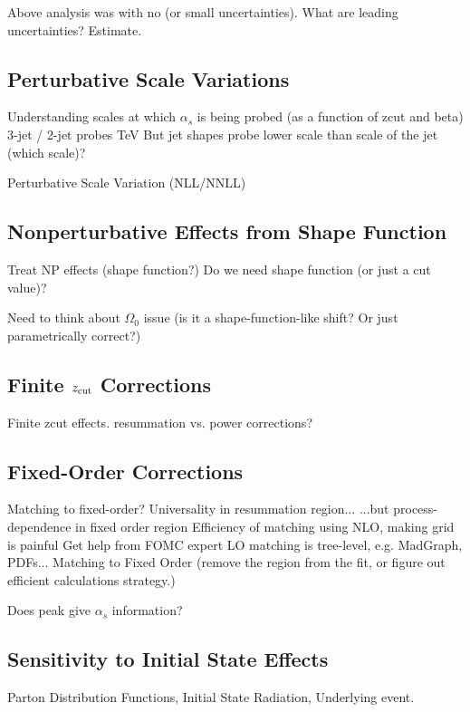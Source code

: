 
Above analysis was with no (or small uncertainties).  What are leading uncertainties?  Estimate.

\subsection{Perturbative Scale Variations}

	Understanding scales at which $\alpha_s$ is being probed (as a function of zcut and beta)
		3-jet / 2-jet probes TeV
		But jet shapes probe lower scale than scale of the jet (which scale)?

	Perturbative Scale Variation (NLL/NNLL)


\subsection{Nonperturbative Effects from Shape Function}

	Treat NP effects (shape function?)  	Do we need shape function (or just a cut value)?

	Need to think about $\Omega_0$ issue (is it a shape-function-like shift?  Or just parametrically correct?)


\subsection{Finite $z_{\rm cut}$ Corrections}

	Finite zcut effects.  resummation vs.  power corrections?

\subsection{Fixed-Order Corrections}

	Matching to fixed-order?
		Universality in resummation region...
		...but process-dependence in fixed order region
		Efficiency of matching using NLO, making grid is painful
		Get help from FOMC expert
		LO matching is tree-level, e.g. MadGraph, PDFs...
		Matching to Fixed Order (remove the region from the fit, or figure out efficient calculations strategy.)

	Does peak give $\alpha_s$ information?
	
\subsection{Sensitivity to Initial State Effects }

	Parton Distribution Functions, 	Initial State Radiation, Underlying event.



